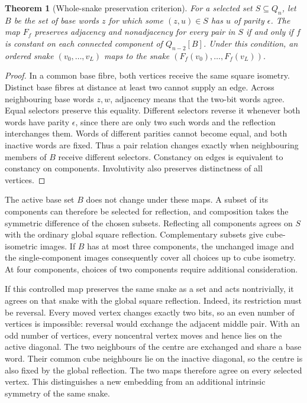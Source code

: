 \documentclass[11pt,a4paper]{article}
\newtheorem{theorem}{Theorem}[section]
\theoremstyle{definition}
\theoremstyle{remark}
\begin{document}
\begin{theorem}[Whole-snake preservation criterion]
\label{thm:controlled202}
For a selected set $S\subseteq Q_n$, let $B$ be the set of base words
$z$ for which some $(z,u)\in S$ has $u$ of parity $\epsilon$.
The map $F_f$ preserves adjacency and nonadjacency for every pair
in $S$ if and only if $f$ is constant on each connected component
of $Q_{n-2}[B]$. Under this condition, an ordered snake
$(v_0,\ldots,v_L)$ maps to the snake $(F_f(v_0),\ldots,F_f(v_L))$.
\end{theorem}
\begin{proof}
In a common base fibre, both vertices receive the same square isometry.
Distinct base fibres at distance at least two cannot supply an edge.
Across neighbouring base words $z,w$, adjacency means that the two-bit
words agree. Equal selectors preserve this equality. Different selectors
reverse it whenever both words have parity $\epsilon$, since there are
only two such words and the reflection interchanges them. Words of
different parities cannot become equal, and both inactive words are fixed.
Thus a pair relation changes exactly when neighbouring members of $B$
receive different selectors. Constancy on edges is equivalent to constancy
on components. Involutivity also preserves distinctness of all vertices.
\end{proof}

The active base set $B$ does not change under these maps. A subset
of its components can therefore be selected for reflection, and
composition takes the symmetric difference of the chosen subsets.
Reflecting all components agrees on $S$ with the ordinary global
square reflection. Complementary subsets give cube-isometric images.
If $B$ has at most three components, the unchanged image and the
single-component images consequently cover all choices up to cube
isometry. At four components, choices of two components require
additional consideration.

If this controlled map preserves the same snake as a set and acts
nontrivially, it agrees on that snake with the global square reflection.
Indeed, its restriction must be reversal. Every moved vertex changes
exactly two bits, so an even number of vertices is impossible: reversal
would exchange the adjacent middle pair. With an odd number of vertices,
every noncentral vertex moves and hence lies on the active diagonal.
The two neighbours of the centre are exchanged and share a base word.
Their common cube neighbours lie on the inactive diagonal, so the
centre is also fixed by the global reflection. The two maps therefore
agree on every selected vertex. This distinguishes a new embedding
from an additional intrinsic symmetry of the same snake.
\end{document}
